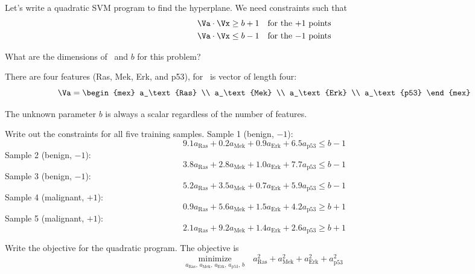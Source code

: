 \documentclass[12pt]{pajarticle}
\begin{document}
Let's write a quadratic SVM program to find the hyperplane. We need constraints such that
\begin{align*}
	\Va\cdot\Vx &\ge b+1 \quad\text{for the $+1$ points} \\
	\Va\cdot\Vx &\le b-1 \quad\text{for the $-1$ points}	
\end{align*}

\begin{question}{2}{
What are the dimensions of \Va\ and $b$ for this problem?}{
There are four features (Ras, Mek, Erk, and p53), for \Va\ is vector of length four:
\[ \Va = \begin{mex} a_\text{Ras} \\ a_\text{Mek} \\ a_\text{Erk} \\ a_\text{p53} \end{mex} \]

The unknown parameter $b$ is always a scalar regardless of the number of features.
}
\end{question}

\begin{question}{3}{
Write out the constraints for all five training samples.}{
Sample 1 (benign, $-1$):
\[ 9.1a_\text{Ras} + 0.2a_\text{Mek} + 0.9a_\text{Erk} + 6.5a_\text{p53} \le b - 1 \]
Sample 2 (benign, $-1$):
\[ 3.8a_\text{Ras} + 2.8a_\text{Mek} + 1.0a_\text{Erk} + 7.7a_\text{p53} \le b - 1 \]
Sample 3 (benign, $-1$):
\[ 5.2a_\text{Ras} + 3.5a_\text{Mek} + 0.7a_\text{Erk} + 5.9a_\text{p53} \le b - 1 \]
Sample 4 (malignant, $+1$):
\[ 0.9a_\text{Ras} + 5.6a_\text{Mek} + 1.5a_\text{Erk} + 4.2a_\text{p53} \ge b + 1 \]
Sample 5 (malignant, $+1$):
\[ 2.1a_\text{Ras} + 9.2a_\text{Mek} + 1.4a_\text{Erk} + 2.6a_\text{p53} \ge b + 1 \]
}	
\end{question}

\begin{question}{4}{
Write the objective for the quadratic program.}{
The objective is
\[ \underset{a_\text{Ras},\, a_\text{Mek},\, a_\text{Erk},\, a_\text{p53},\, b}{\text{minimize}} \quad a_\text{Ras}^2 + a_\text{Mek}^2 + a_\text{Erk}^2 + a_\text{p53}^2 \]
}	
\end{question}
\end{document}
